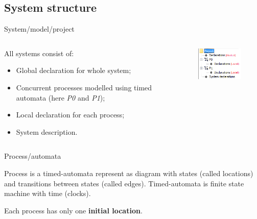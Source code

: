 \documentclass{beamer}
\begin{document}
\subsection{System structure}
\begin{frame}{System/model/project}
	
	\begin{columns}
		\begin{column}{0.7\textwidth}
			All systems consist of:	
			\begin{itemize}
				\item Global declaration for whole system;
				\item Concurrent processes modelled using timed automata (here \textit{P0} and \textit{P1});
				\item Local declaration for each process;
				\item System description.
			\end{itemize}
		\end{column}
		
		\begin{column}{0.37\textwidth}
			\begin{figure}[H]
				\includegraphics[scale=1]{img/uppaal_project.png}
			\end{figure}
		\end{column}
	\end{columns}
\end{frame}

\begin{frame}{Process/automata}
	
	Process is a timed-automata represent as diagram with states
	(called locations) and transitions between states (called edges). Timed-automata is finite state machine with time (clocks).\newline

	Each process has only one \textbf{initial location}.\newline
\end{frame}
\end{document}
